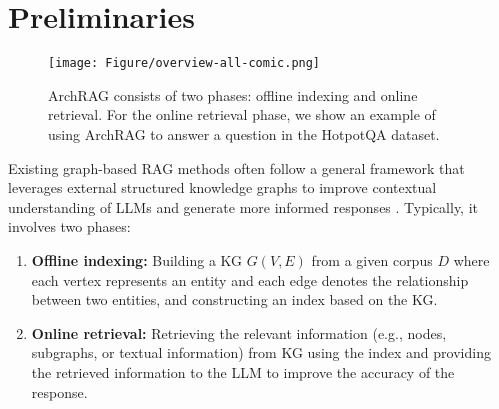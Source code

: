 \section{Preliminaries}
\label{sec:problem-formulation}

\begin{figure*}
    \centering
    \setlength{\abovecaptionskip}{-0.05cm}
    \setlength{\belowcaptionskip}{-0.2cm}
    \texttt{[image: Figure/overview-all-comic.png]}
    \caption{ArchRAG consists of two phases: offline indexing and online retrieval. For the online retrieval phase, we show an example of using ArchRAG to answer a question in the HotpotQA dataset.}
    \label{fig:overview}
\end{figure*}



Existing graph-based RAG methods often follow a general framework that leverages external structured knowledge graphs to improve contextual understanding of LLMs and generate more informed responses \cite{peng2024graph}.
% 
Typically, it involves two phases: 
\begin{enumerate}
    \item {\bf Offline indexing:} Building a KG $G(V,E)$ from a given corpus $D$ where each vertex represents an entity and each edge denotes the relationship between two entities, and constructing an index based on the KG.

    \item {\bf Online retrieval:} Retrieving the relevant information (e.g., nodes, subgraphs, or textual information) from KG using the index and providing the retrieved information to the LLM to improve the accuracy of the response.
    
\end{enumerate}

